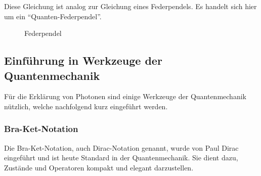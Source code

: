 




Diese Gleichung ist analog zur Gleichung eines Federpendels.
Es handelt sich hier um ein ``Quanten-Federpendel''.    
\begin{figure}
\centering
{}
\caption{Federpendel}\label{fourier:figure:federpendel}
\end{figure}

\subsection{Einführung in Werkzeuge der Quantenmechanik\label{fourier:subsection:werkzeugeQuantenmechanik}}
Für die Erklärung von Photonen sind einige Werkzeuge der Quantenmechanik nützlich, welche nachfolgend kurz eingeführt werden.

\subsubsection{Bra-Ket-Notation\label{fourier:subsubsection:braKetNotation}} %
Die Bra-Ket-Notation, auch Dirac-Notation genannt, wurde von Paul Dirac eingeführt und ist heute Standard in der Quantenmechanik.
Sie dient dazu, Zustände und Operatoren kompakt und elegant darzustellen.

